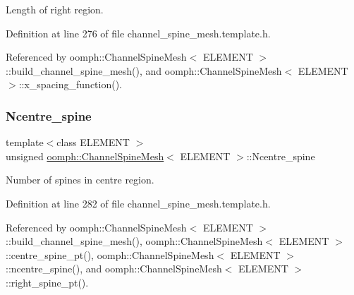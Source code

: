 Length of right region. 



Definition at line 276 of file channel\+\_\+spine\+\_\+mesh.\+template.\+h.



Referenced by oomph\+::\+Channel\+Spine\+Mesh$<$ E\+L\+E\+M\+E\+N\+T $>$\+::build\+\_\+channel\+\_\+spine\+\_\+mesh(), and oomph\+::\+Channel\+Spine\+Mesh$<$ E\+L\+E\+M\+E\+N\+T $>$\+::x\+\_\+spacing\+\_\+function().

\mbox{\label{classoomph_1_1ChannelSpineMesh_af6ef1bb007083a803561e5f0062f820b}} 
\subsubsection{\texorpdfstring{Ncentre\+\_\+spine}{Ncentre\_spine}}
{\footnotesize\ttfamily template$<$class E\+L\+E\+M\+E\+NT $>$ \\
unsigned \hyperlink{classoomph_1_1ChannelSpineMesh}{oomph\+::\+Channel\+Spine\+Mesh}$<$ E\+L\+E\+M\+E\+NT $>$\+::Ncentre\+\_\+spine\hspace{0.3cm}{\ttfamily [protected]}}



Number of spines in centre region. 



Definition at line 282 of file channel\+\_\+spine\+\_\+mesh.\+template.\+h.



Referenced by oomph\+::\+Channel\+Spine\+Mesh$<$ E\+L\+E\+M\+E\+N\+T $>$\+::build\+\_\+channel\+\_\+spine\+\_\+mesh(), oomph\+::\+Channel\+Spine\+Mesh$<$ E\+L\+E\+M\+E\+N\+T $>$\+::centre\+\_\+spine\+\_\+pt(), oomph\+::\+Channel\+Spine\+Mesh$<$ E\+L\+E\+M\+E\+N\+T $>$\+::ncentre\+\_\+spine(), and oomph\+::\+Channel\+Spine\+Mesh$<$ E\+L\+E\+M\+E\+N\+T $>$\+::right\+\_\+spine\+\_\+pt().

\mbox{\label{classoomph_1_1ChannelSpineMesh_a56fbad56271c5e37cd7f1d2de7b7bb36}} 
